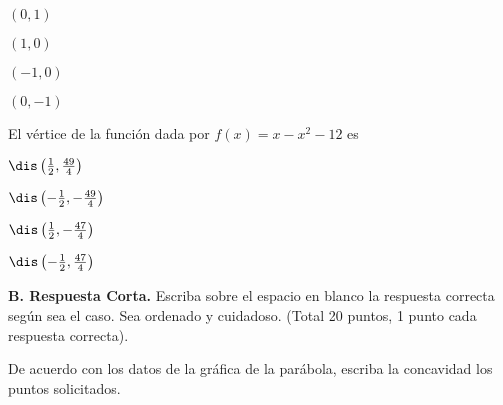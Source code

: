 \documentclass[12pt, fleqn]{article}
\begin{document}
\benu
\item[] \opc $(0,1)$ \vf
\item[] \opc $(1,0)$ \vf
\item[] \opc $(-1,0)$ \vf
\item[] \opc $(0,-1)$
\eenu\vs

\item El vértice de la función dada por $f(x)=x-x^2-12$ es \vp

\benu
\item[] \opc $\dis\left(\frac12,\frac{49}{4}\right)$ \vf
\item[] \opc $\dis\left(-\frac12,-\frac{49}{4}\right)$ \vf
\item[] \opc $\dis\left(\frac12,-\frac{47}{4}\right)$ \vf
\item[] \opc $\dis\left(-\frac12,\frac{47}{4}\right)$
\eenu\vs

\eenu
\pagebreak

{\bf B. Respuesta Corta.} Escriba sobre el espacio en blanco la respuesta correcta según sea el caso. Sea ordenado y cuidadoso. (Total 20 puntos, 1 punto cada respuesta correcta).\vs

\benu
\item De acuerdo con los datos de la gráfica de la parábola, escriba la concavidad los puntos solicitados. \vs\vs\vs
\end{document}
